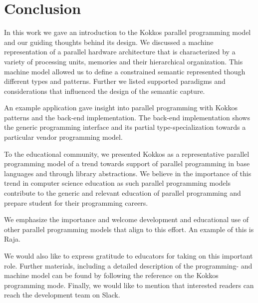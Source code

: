 \section{Conclusion}\label{chap:conclusion}
In this work we gave an introduction to the Kokkos parallel programming model and our guiding thoughts behind its design. We discussed a machine representation of a parallel hardware architecture that is characterized by a variety of processing units, memories and their hierarchical organization. This machine model allowed us to define a constrained semantic represented though different types and patterns. Further we listed supported paradigms and considerations that influenced the design of the semantic capture.

An example application gave insight into parallel programming with Kokkos patterns and the back-end implementation. The back-end implementation shows the generic programming interface and its partial type-specialization towards a particular vendor programming model.

To the educational community, we presented Kokkos as a representative parallel programming model of a trend towards support of parallel programming in base languages and through library abstractions. We believe in the importance of this trend in computer science education as such parallel programming models contribute to the generic and relevant education of parallel programming and prepare student for their programming careers.

We emphasize the importance and welcome development and educational use of other parallel programming models that align to this effort. An example of this is Raja. 

We would also like to express gratitude to educators for taking on this important role. Further materials, including a detailed description of the programming- and machine model can be found by following the reference on the Kokkos programming mode. Finally, we would like to mention that interested readers can reach the development team on Slack\cite{KOKKOSLACK}.
